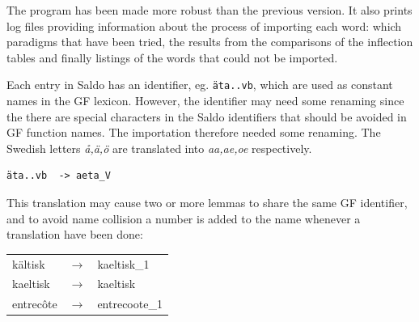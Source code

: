 \documentclass{report}
\begin{document}
The program has been made more robust than the previous version. It also prints
log files providing
information about the process of importing each word: which paradigms that have been
tried, the results from the comparisons of the inflection tables and finally listings
of the words that could not be imported.

Each entry in Saldo has an identifier, eg. \verb-äta..vb-, which are used as 
constant names in the GF lexicon. However, the identifier may need some renaming since
the there are special characters  in the Saldo identifiers
that should be avoided in GF function names. The importation therefore
needed some renaming. The Swedish letters \emph{å,ä,ö} are translated into
\emph{aa,ae,oe} respectively. 
\begin{verbatim}äta..vb  -> aeta_V \end{verbatim}
This translation may cause two or more lemmas to share the same
GF identifier, and to avoid name collision a number is added to the name
whenever a translation have been done: 
\begin{tabular}{lll}
kältisk & $\rightarrow$ & kaeltisk\_1 \\
kaeltisk & $\rightarrow$ & kaeltisk \\
entrecôte &$\rightarrow$ & entrecoote\_1 \\ 
\end{tabular}\\


\end{document}
